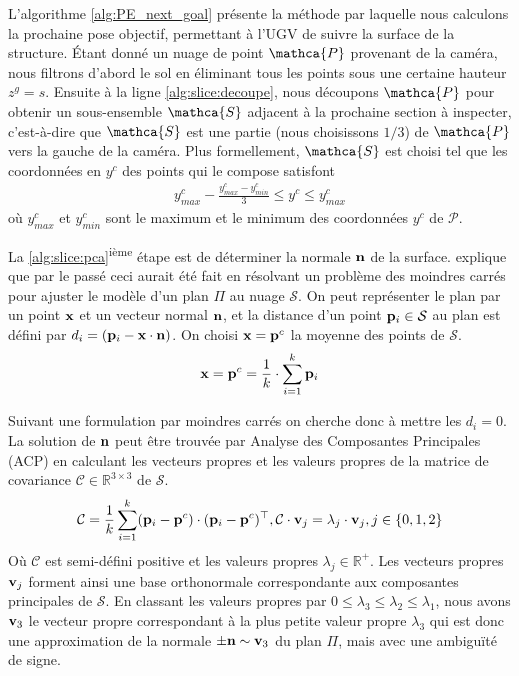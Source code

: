 L'algorithme \ref{alg:PE_next_goal} présente la méthode par laquelle nous calculons la prochaine pose objectif, permettant à l'UGV de suivre la surface de la structure. Étant donné un nuage de point $\mathca{P}$ provenant de la caméra, nous filtrons d'abord le sol en éliminant tous les points sous une certaine hauteur $z^g = s$. Ensuite à la ligne \ref{alg:slice:decoupe}, nous découpons $\mathca{P}$ pour obtenir un sous-ensemble $\mathca{S}$ adjacent à la prochaine section à inspecter, c'est-à-dire que $\mathca{S}$ est une partie (nous choisissons $1/3$) de $\mathca{P}$ vers la gauche de la caméra. Plus formellement, $\mathca{S}$ est choisi tel que les coordonnées en $y^c$ des points qui le compose satisfont
\begin{align}
  y^c_{max} - \frac{y^c_{max} - y^c_{min}}{3} \leq y^c \leq y^c_{max}
\end{align}
où $y^c_{max}$ et $y^c_{min}$ sont le maximum et le minimum des coordonnées $y^c$ de $\mathcal{P}$.

La \ref{alg:slice:pca}\textsuperscript{ième} étape est de déterminer la normale $\mathbf{n}$ de la surface. \citep{Rusu2009} explique que par le passé ceci aurait été fait en résolvant un problème des moindres carrés pour ajuster le modèle d'un plan $\Pi$ au nuage $\mathcal{S}$. On peut représenter le plan par un point $\mathbf{x}$ et un vecteur normal $\mathbf{n}$, et la distance d'un point $\mathbf{p}_i \in \mathcal{S}$ au plan est défini par $d_i = (\mathbf{p}_i - \mathbf{x} \cdot \mathbf{n})$. On choisi $\mathbf{x} = \mathbf{p}^c$ la moyenne des points de $\mathcal{S}$.
\begin{align}
  \mathbf{x} = \mathbf{p}^c = \frac{1}{k} \cdot \sum^{k}_{i=1} \mathbf{p}_i
\end{align}

Suivant une formulation par moindres carrés on cherche donc à mettre les $d_i = 0$. La solution de $\mathbf{n}$ peut être trouvée par Analyse des Composantes Principales (ACP) en calculant les vecteurs propres et les valeurs propres de la matrice de covariance $\mathcal{C} \in \mathbb{R}^{3\times 3}$ de $\mathcal{S}$.
\begin{align}
  \mathcal{C} = \frac{1}{k} \sum^{k}_{i=1} (\mathbf{p}_i - \mathbf{p}^c) \cdot (\mathbf{p}_i - \mathbf{p}^c)^\top, \mathcal{C} \cdot \mathbf{v}_j = \lambda_j \cdot \mathbf{v}_j, j \in \{0, 1, 2\}
\end{align}
Où $\mathcal{C}$ est semi-défini positive et les valeurs propres $\lambda_j \in \mathbb{R}^+$. Les vecteurs propres $\mathbf{v}_j$ forment ainsi une base orthonormale correspondante aux composantes principales de $\mathcal{S}$. En classant les valeurs propres par $0 \leq \lambda_3 \leq \lambda_2 \leq \lambda_1$, nous avons $\mathbf{v}_3$ le vecteur propre correspondant à la plus petite valeur propre $\lambda_3$ qui est donc une approximation de la normale $\pm \mathbf{n} \sim \mathbf{v}_{3}$ du plan $\Pi$, mais avec une ambiguïté de signe.

